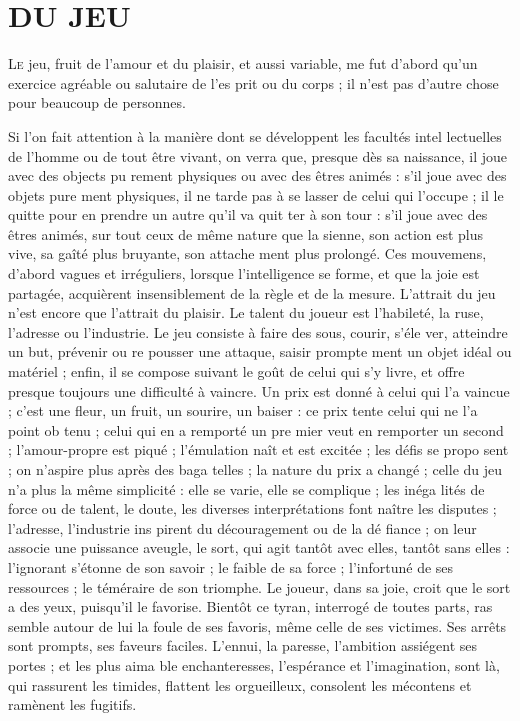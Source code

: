 \chapter[Du Jeu]{DU JEU}

\lettrine{L}{e} jeu, fruit de l'amour et du plaisir,
et aussi variable, me fut d'abord qu'un
exercice agréable ou salutaire de l'es%
prit ou du corps ; il n'est pas d'autre
chose pour beaucoup de personnes.

Si l'on fait attention à la manière
dont se développent les facultés intel%
lectuelles de l'homme ou de tout être
vivant, on verra que, presque dès sa
naissance, il joue avec des objects pu%
rement physiques ou avec des êtres
animés : s'il joue avec des objets pure%
ment physiques, il ne tarde pas à se
lasser de celui qui l'occupe ; il le quitte
pour en prendre un autre qu'il va quit%
ter à son tour : s'il joue avec des êtres
animés, sur tout ceux de même nature
que la sienne, son action est plus vive,
sa gaîté plus bruyante, son attache%
ment plus prolongé. Ces mouvemens,
d'abord vagues et irréguliers, lorsque
l'intelligence se forme, et que la joie est
partagée, acquièrent insensiblement
de la règle et de la mesure. L'attrait du
jeu n'est encore que l'attrait du plaisir.
Le talent du joueur est l'habileté, la
ruse, l'adresse ou l'industrie. Le jeu
consiste à faire des sous, courir, s'éle%
ver, atteindre un but, prévenir ou re%
pousser une attaque, saisir prompte%
ment un objet idéal ou matériel ; enfin,
il se compose suivant le goût de celui
qui s'y livre, et offre presque toujours
une difficulté à vaincre. Un prix est
donné à celui qui l'a vaincue ; c'est une
fleur, un fruit, un sourire, un baiser :
ce prix tente celui qui ne l'a point ob%
tenu ; celui qui en a remporté un pre%
mier veut en remporter un second ;
l'amour-propre est piqué ; l'émulation
naît et est excitée ; les défis se propo%
sent ; on n'aspire plus après des baga%
telles ; la nature du prix a changé ; celle
du jeu n'a plus la même simplicité : elle
se varie, elle se complique ; les inéga%
lités de force ou de talent, le doute,
les diverses interprétations font naître
les disputes ; l'adresse, l'industrie ins%
pirent du découragement ou de la dé%
fiance ; on leur associe une puissance
aveugle, le sort, qui agit tantôt avec
elles, tantôt sans elles : l'ignorant
s'étonne de son savoir ; le faible de sa
force ; l'infortuné de ses ressources ; le
téméraire de son triomphe. Le joueur,
dans sa joie, croit que le sort a des
yeux, puisqu'il le favorise. Bientôt ce
tyran, interrogé de toutes parts, ras%
semble autour de lui la foule de ses
favoris, même celle de ses victimes.
Ses arrêts sont prompts, ses faveurs
faciles. L'ennui, la paresse, l'ambition
assiégent ses portes ; et les plus aima%
ble enchanteresses, l'espérance et
l'imagination, sont là, qui rassurent
les timides, flattent les orgueilleux,
consolent les mécontens et ramènent 
les fugitifs.

